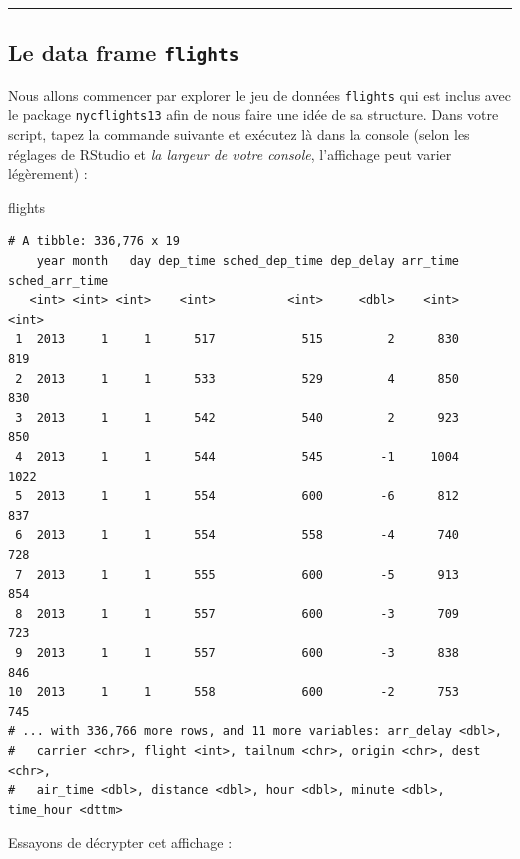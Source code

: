 \documentclass[a4paperpaper,]{article}
\newenvironment{Shaded}{\begin{snugshade}}{\end{snugshade}}
\newcommand{\NormalTok}[1]{#1}
\theoremstyle{definition}
\theoremstyle{definition}
\theoremstyle{definition}
\theoremstyle{remark}
\begin{document}
\begin{center}\rule{0.5\linewidth}{\linethickness}\end{center}

\subsection{\texorpdfstring{Le data frame
\texttt{flights}}{Le data frame flights}}\label{le-data-frame-flights}

Nous allons commencer par explorer le jeu de données \texttt{flights}
qui est inclus avec le package \texttt{nycflights13} afin de nous faire
une idée de sa structure. Dans votre script, tapez la commande suivante
et exécutez là dans la console (selon les réglages de RStudio et
\emph{la largeur de votre console}, l'affichage peut varier légèrement)
:

\begin{Shaded}
\begin{Highlighting}[]
\NormalTok{flights}
\end{Highlighting}
\end{Shaded}

\begin{verbatim}
# A tibble: 336,776 x 19
    year month   day dep_time sched_dep_time dep_delay arr_time sched_arr_time
   <int> <int> <int>    <int>          <int>     <dbl>    <int>          <int>
 1  2013     1     1      517            515         2      830            819
 2  2013     1     1      533            529         4      850            830
 3  2013     1     1      542            540         2      923            850
 4  2013     1     1      544            545        -1     1004           1022
 5  2013     1     1      554            600        -6      812            837
 6  2013     1     1      554            558        -4      740            728
 7  2013     1     1      555            600        -5      913            854
 8  2013     1     1      557            600        -3      709            723
 9  2013     1     1      557            600        -3      838            846
10  2013     1     1      558            600        -2      753            745
# ... with 336,766 more rows, and 11 more variables: arr_delay <dbl>,
#   carrier <chr>, flight <int>, tailnum <chr>, origin <chr>, dest <chr>,
#   air_time <dbl>, distance <dbl>, hour <dbl>, minute <dbl>, time_hour <dttm>
\end{verbatim}

Essayons de décrypter cet affichage :
\end{document}
